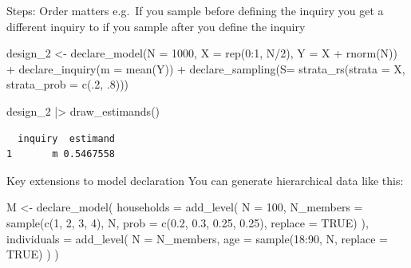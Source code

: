 \documentclass[
  11pt,
  ignorenonframetext,
]{beamer}
\newenvironment{Shaded}{\begin{snugshade}}{\end{snugshade}}
\newcommand{\AttributeTok}[1]{\textcolor[rgb]{0.40,0.45,0.13}{#1}}
\newcommand{\ConstantTok}[1]{\textcolor[rgb]{0.56,0.35,0.01}{#1}}
\newcommand{\DecValTok}[1]{\textcolor[rgb]{0.68,0.00,0.00}{#1}}
\newcommand{\FloatTok}[1]{\textcolor[rgb]{0.68,0.00,0.00}{#1}}
\newcommand{\FunctionTok}[1]{\textcolor[rgb]{0.28,0.35,0.67}{#1}}
\newcommand{\NormalTok}[1]{\textcolor[rgb]{0.00,0.23,0.31}{#1}}
\newcommand{\OtherTok}[1]{\textcolor[rgb]{0.00,0.23,0.31}{#1}}
\newcommand{\SpecialCharTok}[1]{\textcolor[rgb]{0.37,0.37,0.37}{#1}}
\begin{document}
\begin{frame}[fragile]{Steps: Order matters}
\protect\hypertarget{steps-order-matters-1}{}
e.g.~If you sample before defining the inquiry you get a different
inquiry to if you sample after you define the inquiry

\begin{Shaded}
\begin{Highlighting}[]
\NormalTok{design\_2 }\OtherTok{\textless{}{-}} 
  \FunctionTok{declare\_model}\NormalTok{(}\AttributeTok{N =} \DecValTok{1000}\NormalTok{, }\AttributeTok{X =} \FunctionTok{rep}\NormalTok{(}\DecValTok{0}\SpecialCharTok{:}\DecValTok{1}\NormalTok{, N}\SpecialCharTok{/}\DecValTok{2}\NormalTok{), }\AttributeTok{Y =}\NormalTok{ X }\SpecialCharTok{+} \FunctionTok{rnorm}\NormalTok{(N)) }\SpecialCharTok{+} 
  \FunctionTok{declare\_inquiry}\NormalTok{(}\AttributeTok{m =} \FunctionTok{mean}\NormalTok{(Y)) }\SpecialCharTok{+}
  \FunctionTok{declare\_sampling}\NormalTok{(}\AttributeTok{S=} \FunctionTok{strata\_rs}\NormalTok{(}\AttributeTok{strata =}\NormalTok{ X, }\AttributeTok{strata\_prob =} \FunctionTok{c}\NormalTok{(.}\DecValTok{2}\NormalTok{, .}\DecValTok{8}\NormalTok{))) }

\NormalTok{design\_2 }\SpecialCharTok{|\textgreater{}} \FunctionTok{draw\_estimands}\NormalTok{()}
\end{Highlighting}
\end{Shaded}

\begin{verbatim}
  inquiry  estimand
1       m 0.5467558
\end{verbatim}
\end{frame}

\begin{frame}[fragile]{Key extensions to model declaration}
\protect\hypertarget{key-extensions-to-model-declaration}{}
You can generate hierarchical data like this:

\begin{Shaded}
\begin{Highlighting}[]
\NormalTok{M }\OtherTok{\textless{}{-}} 
  \FunctionTok{declare\_model}\NormalTok{(}
    \AttributeTok{households =} \FunctionTok{add\_level}\NormalTok{(}
      \AttributeTok{N =} \DecValTok{100}\NormalTok{, }
      \AttributeTok{N\_members =} \FunctionTok{sample}\NormalTok{(}\FunctionTok{c}\NormalTok{(}\DecValTok{1}\NormalTok{, }\DecValTok{2}\NormalTok{, }\DecValTok{3}\NormalTok{, }\DecValTok{4}\NormalTok{), N, }
                         \AttributeTok{prob =} \FunctionTok{c}\NormalTok{(}\FloatTok{0.2}\NormalTok{, }\FloatTok{0.3}\NormalTok{, }\FloatTok{0.25}\NormalTok{, }\FloatTok{0.25}\NormalTok{), }\AttributeTok{replace =} \ConstantTok{TRUE}\NormalTok{)}
\NormalTok{    ),}
    \AttributeTok{individuals =} \FunctionTok{add\_level}\NormalTok{(}
      \AttributeTok{N =}\NormalTok{ N\_members, }
      \AttributeTok{age =} \FunctionTok{sample}\NormalTok{(}\DecValTok{18}\SpecialCharTok{:}\DecValTok{90}\NormalTok{, N, }\AttributeTok{replace =} \ConstantTok{TRUE}\NormalTok{)}
\NormalTok{    )}
\NormalTok{  )}
\end{Highlighting}
\end{Shaded}
\end{frame}
\end{document}
